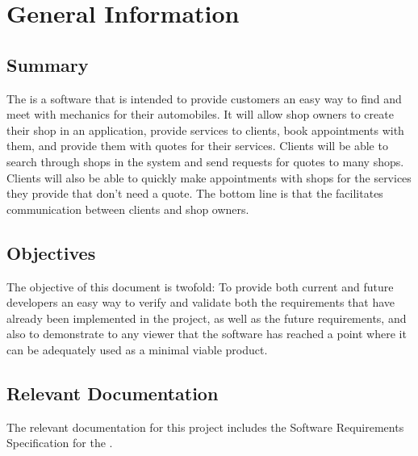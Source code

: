 \documentclass[12pt, titlepage]{article}
\begin{document}
\section{General Information}

\subsection{Summary}

The \progname{} is a software that is intended to provide customers an easy way to find and meet with mechanics for their automobiles. It will allow shop owners to create their shop in an application, provide services to clients, book appointments with them, and provide them with quotes for their services. Clients will be able to search through shops in the system and send requests for quotes to many shops. Clients will also be able to quickly make appointments with shops for the services they provide that don't need a quote. The bottom line is that the \progname{} facilitates communication between clients and shop owners.

\subsection{Objectives}

The objective of this document is twofold: To provide both current and future developers an easy way to verify and validate both the requirements that have already been implemented in the project, as well as the future requirements, and also to demonstrate to any viewer that the software has reached a point where it can be adequately used as a minimal viable product.

\subsection{Relevant Documentation}


The relevant documentation for this project includes the Software Requirements Specification for the \progname{}.
\end{document}
